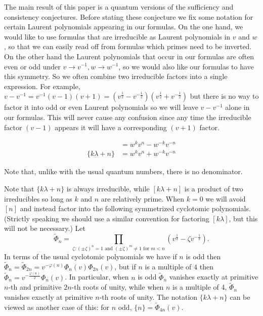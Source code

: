 \documentclass[12pt]{amsart}
\begin{document}
The main result of this paper is a quantum versions of the sufficiency and
consistency conjectures.   Before stating these conjecture we fix some
notation for certain Laurent polynomials appearing in our formulas.  On the
one hand, we would like to use formulas that are irreducible as Laurent
polynomials in $v$ and $w$, so that we can easily read off from formulas which
primes need to be inverted.  On the other hand the Laurent polynomials that
occur in our formulas are often even or odd under $v \rightarrow v^{-1}, w
\rightarrow w^{-1}$, so we would also like our formulas to have this symmetry.
So we often combine two irreducible factors into a single expression.  For
example, $v-v^{-1} = v^{-1}(v-1)(v+1) =
(v^{\frac{1}{2}}-v^{-\frac{1}{2}})(v^{\frac{1}{2}}+v^{-\frac{1}{2}})$ but
there is no way to factor it into odd or even Laurent polynomials so we will
leave $v-v^{-1}$ alone in our formulas.  This will never cause any confusion
since any time the irreducible factor $(v-1)$ appears it will have a
corresponding $(v+1)$ factor.

\begin{align*}
[k\lambda + n] &= w^kv^n - w^{-k}v^{-n}\\
\{k\lambda + n\} &= w^k v^n + w^{-k} v^{-n}
\end{align*}

\begin{warning}
Note that, unlike with the usual quantum numbers, there is no denominator.
\end{warning}

Note that $\{k\lambda + n\}$ is always irreducible, while $[k\lambda +
n]$ is a product of two irreducibles so long as $k$ and $n$ are
relatively prime.  When
$k=0$ we will avoid $[n]$ and instead factor into the following
symmetrized cyclotomic polynomials.  (Strictly speaking we should use
a similar convention for factoring $[k \lambda]$, but this will not be
necessary.)  Let
\[
  \widetilde{\Phi}_n = \prod_{\zeta: (\pm \zeta)^n = 1 \text{ and } (\pm \zeta)^m \neq 1 \text{ for $m < n$}}
  (v^{\frac{1}{2}}-\zeta v^{-\frac{1}{2}}).
\]
In terms of the usual cyclotomic polynomials we have if $n$ is odd
then $\widetilde{\Phi}_n = \widetilde{\Phi}_{2n} = v^{-\varphi(n)}
\Phi_n(v) \Phi_{2n}(v)$, but if $n$ is a multiple of $4$ then
$\widetilde{\Phi}_n = v^{-\frac{\varphi(n)}{2}} \Phi_n(v)$. In particular, when $n$ is odd $\widetilde{\Phi}_n$ vanishes exactly at primitive $n$-th and primitive $2n$-th roots of unity, while when $n$ is a multiple of 4, $\widetilde{\Phi}_n$ vanishes exactly at primitive $n$-th roots of unity.
The notation $\{k\lambda + n\}$ can be viewed as another case of this:
for $n$ odd,
$\{n\} = \widetilde{\Phi}_{4n}(v)$.
\end{document}
